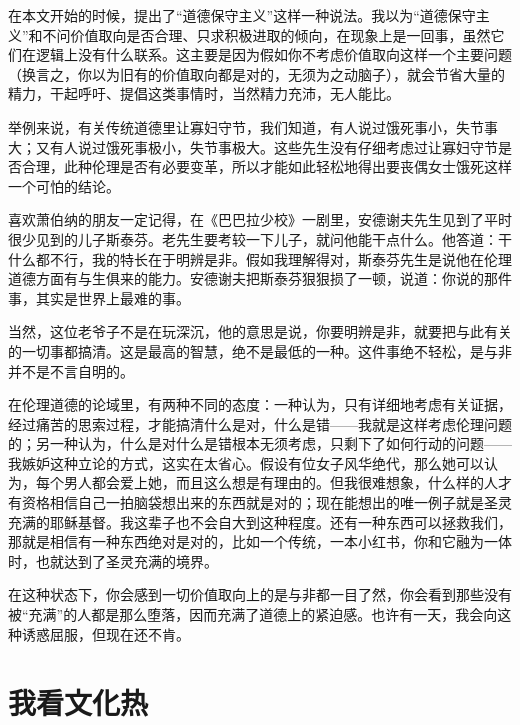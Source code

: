 在本文开始的时候，提出了“道德保守主义”这样一种说法。我以为“道德保守主义”和不问价值取向是否合理、只求积极进取的倾向，在现象上是一回事，虽然它们在逻辑上没有什么联系。这主要是因为假如你不考虑价值取向这样一个主要问题（换言之，你以为旧有的价值取向都是对的，无须为之动脑子），就会节省大量的精力，干起呼吁、提倡这类事情时，当然精力充沛，无人能比。 

举例来说，有关传统道德里让寡妇守节，我们知道，有人说过饿死事小，失节事大；又有人说过饿死事极小，失节事极大。这些先生没有仔细考虑过让寡妇守节是否合理，此种伦理是否有必要变革，所以才能如此轻松地得出要丧偶女士饿死这样一个可怕的结论。 

喜欢萧伯纳的朋友一定记得，在《巴巴拉少校》一剧里，安德谢夫先生见到了平时很少见到的儿子斯泰芬。老先生要考较一下儿子，就问他能干点什么。他答道：干什么都不行，我的特长在于明辨是非。假如我理解得对，斯泰芬先生是说他在伦理道德方面有与生俱来的能力。安德谢夫把斯泰芬狠狠损了一顿，说道：你说的那件事，其实是世界上最难的事。 

当然，这位老爷子不是在玩深沉，他的意思是说，你要明辨是非，就要把与此有关的一切事都搞清。这是最高的智慧，绝不是最低的一种。这件事绝不轻松，是与非并不是不言自明的。 

在伦理道德的论域里，有两种不同的态度：一种认为，只有详细地考虑有关证据，经过痛苦的思索过程，才能搞清什么是对，什么是错——我就是这样考虑伦理问题的；另一种认为，什么是对什么是错根本无须考虑，只剩下了如何行动的问题——我嫉妒这种立论的方式，这实在太省心。假设有位女子风华绝代，那么她可以认为，每个男人都会爱上她，而且这么想是有理由的。但我很难想象，什么样的人才有资格相信自己一拍脑袋想出来的东西就是对的；现在能想出的唯一例子就是圣灵充满的耶稣基督。我这辈子也不会自大到这种程度。还有一种东西可以拯救我们，那就是相信有一种东西绝对是对的，比如一个传统，一本小红书，你和它融为一体时，也就达到了圣灵充满的境界。 

在这种状态下，你会感到一切价值取向上的是与非都一目了然，你会看到那些没有被“充满”的人都是那么堕落，因而充满了道德上的紧迫感。也许有一天，我会向这种诱惑屈服，但现在还不肯。

\chapter{我看文化热}

